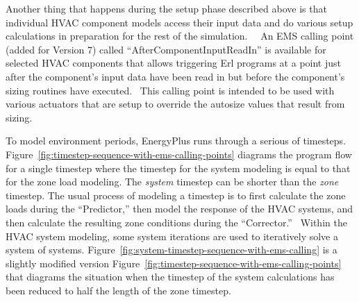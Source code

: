 Another thing that happens during the setup phase described above is that individual HVAC component models access their input data and do various setup calculations in preparation for the rest of the simulation.~~ An EMS calling point (added for Version 7) called ``AfterComponentInputReadIn'' is available for selected HVAC components that allows triggering Erl programs at a point just after the component's input data have been read in but before the component's sizing routines have executed.~ This calling point is intended to be used with various actuators that are setup to override the autosize values that result from sizing.

To model environment periods, EnergyPlus runs through a serious of timesteps. Figure~\ref{fig:timestep-sequence-with-ems-calling-points} diagrams the program flow for a single timestep where the timestep for the system modeling is equal to that for the zone load modeling. The \emph{system} timestep can be shorter than the \emph{zone} timestep. The usual process of modeling a timestep is to first calculate the zone loads during the ``Predictor,'' then model the response of the HVAC systems, and then calculate the resulting zone conditions during the ``Corrector.''~ Within the HVAC system modeling, some system iterations are used to iteratively solve a system of systems. Figure~\ref{fig:system-timestep-sequence-with-ems-calling} is a slightly modified version Figure~\ref{fig:timestep-sequence-with-ems-calling-points} that diagrams the situation when the timestep of the system calculations has been reduced to half the length of the zone timestep.
